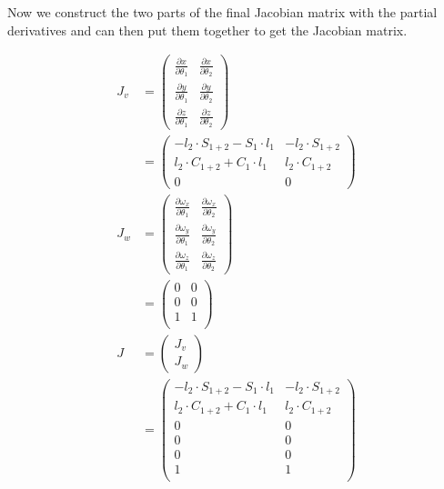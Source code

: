 \documentclass[a4paper,11pt]{article}
\begin{document}
\begin {enumerate}
\begin{enumerate}
				Now we construct the two parts of the final Jacobian matrix with the partial derivatives and can then put them together to get the Jacobian matrix.
				
				\begin{align*}
					J_v &= \begin{pmatrix}
						\frac{\partial x}{\partial \theta_1} & \frac{\partial x}{\partial \theta_2} \\
						\frac{\partial y}{\partial \theta_1} & \frac{\partial y}{\partial \theta_2} \\
						\frac{\partial z}{\partial \theta_1} & \frac{\partial z}{\partial \theta_2}
					\end{pmatrix} \\
					&= \begin{pmatrix}
						- l_2 \cdot S_{1+2} - S_1 \cdot l_1 & - l_2 \cdot S_{1+2}\\
						l_2 \cdot C_{1+2} + C_1 \cdot l_1 & l_2 \cdot C_{1+2}\\
						0 & 0
					\end{pmatrix}\\
					J_w &= \begin{pmatrix}
						\frac{\partial \omega_x}{\partial \theta_1} & \frac{\partial \omega_x}{\partial \theta_2} \\
						\frac{\partial \omega_y}{\partial \theta_1} & \frac{\partial \omega_y}{\partial \theta_2} \\
						\frac{\partial \omega_z}{\partial \theta_1} & \frac{\partial \omega_z}{\partial \theta_2}
					\end{pmatrix} \\
					&= \begin{pmatrix}
						0 & 0 \\
						0 & 0 \\
						1 & 1 \\
					\end{pmatrix}\\
					J &= \begin{pmatrix}
						J_v\\
						J_w
					\end{pmatrix}\\
					&= \begin{pmatrix}
						- l_2 \cdot S_{1+2} - S_1 \cdot l_1 & - l_2 \cdot S_{1+2}\\
						l_2 \cdot C_{1+2} + C_1 \cdot l_1 & l_2 \cdot C_{1+2}\\
						0 & 0\\
						0 & 0 \\
						0 & 0 \\
						1 & 1 \\
					\end{pmatrix}\\
				\end{align*}
				

\end{enumerate}
\end{enumerate}
\end{document}
